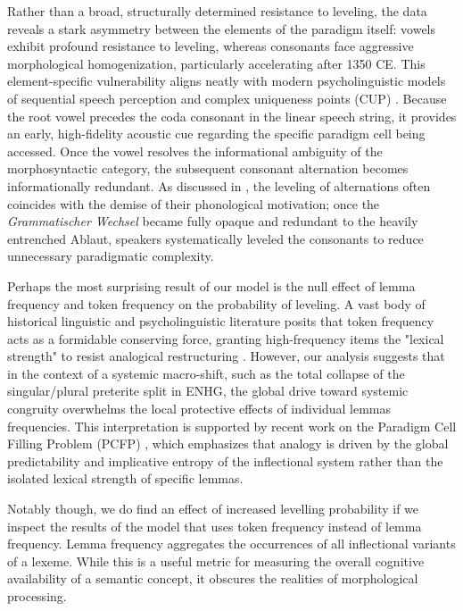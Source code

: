 Rather than a broad, structurally determined resistance to leveling, the data reveals a stark asymmetry between the elements of the paradigm itself: vowels exhibit profound resistance to leveling, whereas consonants face aggressive morphological homogenization, particularly accelerating after 1350 CE. This element-specific vulnerability aligns neatly with modern psycholinguistic models of sequential speech perception and complex uniqueness points (CUP) \citep{cup_paper2008}. Because the root vowel precedes the coda consonant in the linear speech string, it provides an early, high-fidelity acoustic cue regarding the specific paradigm cell being accessed. Once the vowel resolves the informational ambiguity of the morphosyntactic category, the subsequent consonant alternation becomes informationally redundant. As discussed in \cite[pp.~102--121]{fertig2013analogy}, the leveling of alternations often coincides with the demise of their phonological motivation; once the \textit{Grammatischer Wechsel} became fully opaque and redundant to the heavily entrenched Ablaut, speakers systematically leveled the consonants to reduce unnecessary paradigmatic complexity. 

Perhaps the most surprising result of our model is the null effect of lemma frequency and token frequency on the probability of leveling. A vast body of historical linguistic and psycholinguistic literature posits that token frequency acts as a formidable conserving force, granting high-frequency items the "lexical strength" to resist analogical restructuring \citep{desmet_vandevelde2019, fertig2013analogy}. However, our analysis suggests that in the context of a systemic macro-shift, such as the total collapse of the singular/plural preterite split in ENHG, the global drive toward systemic congruity overwhelms the local protective effects of individual lemmas frequencies. This interpretation is supported by recent work on the Paradigm Cell Filling Problem (PCFP) \citep{annual_review_analogy2024}, which emphasizes that analogy is driven by the global predictability and implicative entropy of the inflectional system rather than the isolated lexical strength of specific lemmas. 

Notably though, we do find an effect of increased levelling probability if we inspect the results of the model that uses token frequency instead of lemma frequency. Lemma frequency aggregates the occurrences of all inflectional variants of a lexeme. While this is a useful metric for measuring the overall cognitive availability of a semantic concept, it obscures the realities of morphological processing.

